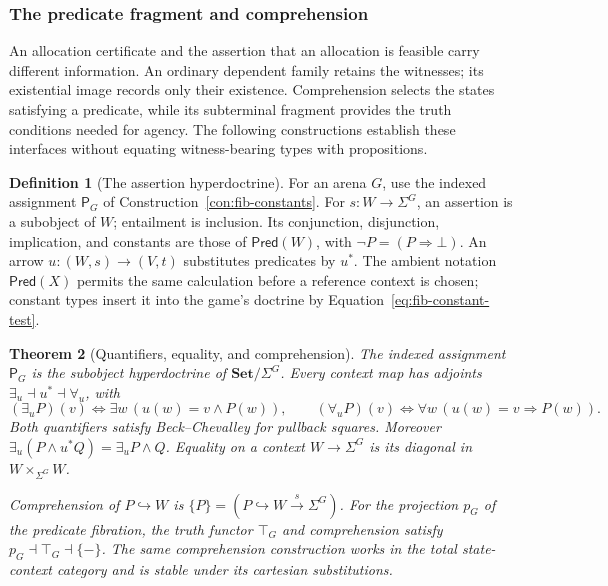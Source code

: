 \documentclass[11pt,a4paper]{article}
\numberwithin{equation}{section}
\newtheorem{theorem}{Theorem}[section]
\theoremstyle{definition}
\newtheorem{definition}[theorem]{Definition}
\theoremstyle{remark}
\theoremstyle{plain}
\begin{document}
\subsubsection{The predicate fragment and comprehension}

An allocation certificate and the assertion that an allocation is
feasible carry different information. An ordinary dependent family retains
the witnesses; its existential image records only their existence.
Comprehension selects the states satisfying a predicate, while its
subterminal fragment provides the truth conditions needed for agency.
The following constructions establish these interfaces without equating
witness-bearing types with propositions.

\begin{definition}[The assertion hyperdoctrine]
\label{def:fib-hyperdoctrine}
For an arena $G$, use the indexed assignment $\mathsf P_G$ of
Construction~\ref{con:fib-constants}. For $s:W\to\Sigma^G$, an assertion is a subobject of $W$;
entailment is inclusion. Its conjunction, disjunction, implication, and constants are
those of $\mathsf{Pred}(W)$, with $\neg P=(P\Rightarrow\bot)$.
An arrow $u:(W,s)\to(V,t)$ substitutes predicates by $u^*$.
The ambient notation $\mathsf{Pred}(X)$ permits the same calculation
before a reference context is chosen; constant types insert it into the
game's doctrine by Equation~\eqref{eq:fib-constant-test}.
\end{definition}

\begin{theorem}[Quantifiers, equality, and comprehension]
\label{prop:egt-quantifiers}\label{prop:egt-hyperdoctrine}
\label{thm:fib-comprehension}
The indexed assignment $\mathsf P_G$ is the subobject hyperdoctrine of
$\mathbf{Set}/\Sigma^G$. Every context map has adjoints
$\exists_u\dashv u^*\dashv\forall_u$, with
\[
 (\exists_uP)(v)\iff\exists w\,(u(w)=v\wedge P(w)),\qquad
 (\forall_uP)(v)\iff\forall w\,(u(w)=v\Rightarrow P(w)).
\]
Both quantifiers satisfy Beck--Chevalley for pullback squares. Moreover
$\exists_u(P\wedge u^*Q)=\exists_uP\wedge Q$.
Equality on a context $W\to\Sigma^G$ is its diagonal in
$W\times_{\Sigma^G}W$.

Comprehension of $P\hookrightarrow W$ is
$\{P\}=(P\hookrightarrow W\xrightarrow{s}\Sigma^G)$.
For the projection $p_G$ of the predicate fibration, the truth functor
$\top_G$ and comprehension satisfy
$p_G\dashv\top_G\dashv\{-\}$.
The same comprehension construction works in the total state-context
category and is stable under its cartesian substitutions.
\end{theorem}
\end{document}
